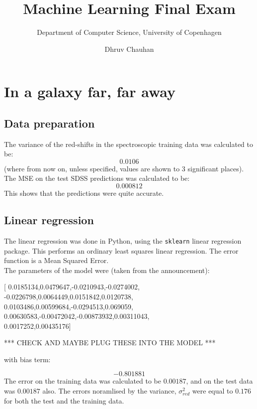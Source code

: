 \documentclass{scrartcl}
\begin{document}
\title{Machine Learning Final Exam}
\subtitle{Department of Computer Science, University of Copenhagen}
\author{Dhruv Chauhan}
\maketitle

\section{In a galaxy far, far away}
\subsection{Data preparation}
The variance of the red-shifts in the spectroscopic training data was calculated to be:
\[ 0.0106 \]
(where from now on, unless specified, values are shown to 3 significant places). \\

The MSE on the test SDSS predictions was calculated to be:
\[ 0.000812 \]
This shows that the predictions were quite accurate.

\subsection{Linear regression}

The linear regression was done in Python, using the \texttt{sklearn} linear regression package. This performs an ordinary least squares linear regression. The error function is a Mean Squared Error. \\

The parameters of the model were (taken from the announcement):
\begin{center}
[  0.0185134,0.0479647,-0.0210943,-0.0274002, \\
-0.0226798,0.0064449,0.0151842,0.0120738, \\
0.0103486,0.00599684,-0.0294513,0.069059, \\
0.00630583,-0.00472042,-0.00873932,0.00311043, \\
0.0017252,0.00435176]
\end{center}

*** CHECK AND MAYBE PLUG THESE INTO THE MODEL ***

with bias term:

\[ -0.801881 \]
The error on the training data was calculated to be $0.00187$, and on the test data was $0.00187$ also. The errors noramlised by the variance, $\sigma^2_{red}$ were equal to $0.176$ for both the test and the training data. \\
\end{document}
